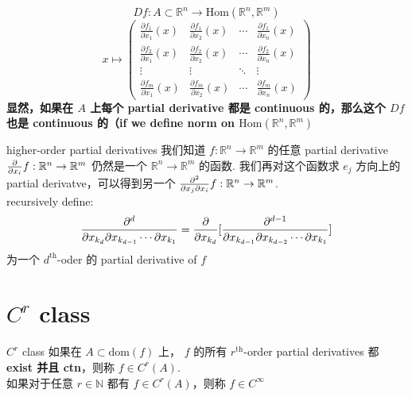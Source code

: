 \documentclass[lang=cn,11pt]{elegantbook}
\begin{document}
\begin{remark}
    $$
        Df: A \subset \mathbb{R}^n \rightarrow \text{Hom}(\mathbb{R}^n, \mathbb{R}^m) 
    $$
    $$
        x \mapsto 
        \begin{pmatrix}
        \frac{\partial f_1}{\partial x_1} (x)& \frac{\partial f_1}{\partial x_2}(x) & \cdots & \frac{\partial f_1}{\partial x_n}(x) \\
        \frac{\partial f_2}{\partial x_1} (x)& \frac{\partial f_2}{\partial x_2}(x) & \cdots & \frac{\partial f_2}{\partial x_n}(x) \\
        \vdots & \vdots & \ddots & \vdots \\
        \frac{\partial f_m}{\partial x_1}(x) & \frac{\partial f_m}{\partial x_2} (x)& \cdots & \frac{\partial f_m}{\partial x_n}(x)
        \end{pmatrix}
    $$
    \textbf{显然，如果在 $A$ 上每个 partial derivative 都是 continuous 的，那么这个 $Df$ 也是 continuous 的（if we define norm on $\text{Hom}(\mathbb{R}^n, \mathbb{R}^m) $}
\end{remark}

\begin{definition}{higher-order partial derivatives}
    我们知道 $f: \mathbb{R}^n \rightarrow \mathbb{R}^m$ 的任意 partial derivative ${\partial \over \partial x_i} f: \mathbb{R}^n \rightarrow \mathbb{R}^m$ 仍然是一个 $\mathbb{R}^n \rightarrow \mathbb{R}^m$ 的函数. 我们再对这个函数求 $e_j$ 方向上的 partial derivatve，可以得到另一个 ${\partial^2 \over \partial x_j \partial x_i} f: \mathbb{R}^n \rightarrow \mathbb{R}^m$.\\
    recursively define: 
    $$
    {\partial^d \over \partial x_{k_d}\partial x_{k_{d-1}}\cdots \partial x_{k_1}} = \frac{\partial }{\partial x_{k_d}}[{\partial^{d-1} \over \partial x_{k_{d-1}}\partial x_{k_{d-2}}\cdots \partial x_{k_1}}]
    $$
    为一个 $d^\text{th}$-oder 的 partial derivative of $f$
\end{definition}


\section{$C^r$ class}
\begin{definition}{$C^r$ class}
    如果在 $A \subset \text{dom}(f)$ 上， $f$ 的所有 $r^\text{th}$-order partial derivatives 都 \textbf{exist 并且 ctn}，则称 $f \in C^r(A)$.
    \\如果对于任意 $r \in \mathbb{N}$ 都有 $f \in C^r(A)$，则称 $f \in C^{\infty}$
\end{definition}
\end{document}
